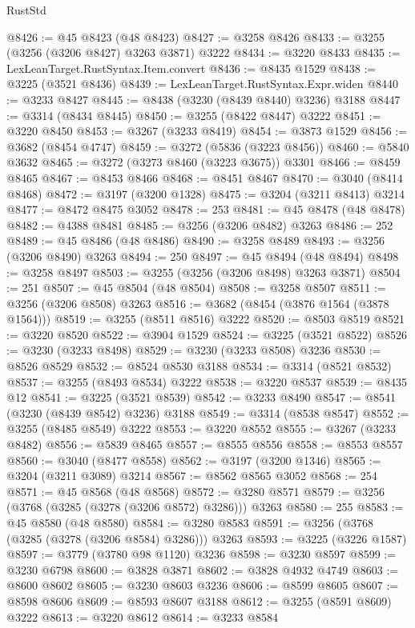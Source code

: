 \begin{lexlean}{RustStd}
\begin{coremodule}
@8426 := @45 @8423 (@48 @8423)
@8427 := @3258 @8426
@8433 := @3255 (@3256 (@3206 @8427) @3263 @3871) @3222
@8434 := @3220 @8433
@8435 := LexLeanTarget.RustSyntax.Item.convert
@8436 := @8435 @1529
@8438 := @3225 (@3521 @8436)
@8439 := LexLeanTarget.RustSyntax.Expr.widen
@8440 := @3233 @8427
@8445 := @8438 (@3230 (@8439 @8440) @3236) @3188
@8447 := @3314 (@8434 @8445)
@8450 := @3255 (@8422 @8447) @3222
@8451 := @3220 @8450
@8453 := @3267 (@3233 @8419)
@8454 := @3873 @1529
@8456 := @3682 (@8454 @4747)
@8459 := @3272 (@5836 (@3223 @8456))
@8460 := @5840 @3632
@8465 := @3272 (@3273 @8460 (@3223 @3675)) @3301
@8466 := @8459 @8465
@8467 := @8453 @8466
@8468 := @8451 @8467
@8470 := @3040 (@8414 @8468)
@8472 := @3197 (@3200 @1328)
@8475 := @3204 (@3211 @8413) @3214
@8477 := @8472 @8475 @3052
@8478 := 253
@8481 := @45 @8478 (@48 @8478)
@8482 := @4388 @8481
@8485 := @3256 (@3206 @8482) @3263
@8486 := 252
@8489 := @45 @8486 (@48 @8486)
@8490 := @3258 @8489
@8493 := @3256 (@3206 @8490) @3263
@8494 := 250
@8497 := @45 @8494 (@48 @8494)
@8498 := @3258 @8497
@8503 := @3255 (@3256 (@3206 @8498) @3263 @3871)
@8504 := 251
@8507 := @45 @8504 (@48 @8504)
@8508 := @3258 @8507
@8511 := @3256 (@3206 @8508) @3263
@8516 := @3682 (@8454 (@3876 @1564 (@3878 @1564)))
@8519 := @3255 (@8511 @8516) @3222
@8520 := @8503 @8519
@8521 := @3220 @8520
@8522 := @3904 @1529
@8524 := @3225 (@3521 @8522)
@8526 := @3230 (@3233 @8498)
@8529 := @3230 (@3233 @8508) @3236
@8530 := @8526 @8529
@8532 := @8524 @8530 @3188
@8534 := @3314 (@8521 @8532)
@8537 := @3255 (@8493 @8534) @3222
@8538 := @3220 @8537
@8539 := @8435 @12
@8541 := @3225 (@3521 @8539)
@8542 := @3233 @8490
@8547 := @8541 (@3230 (@8439 @8542) @3236) @3188
@8549 := @3314 (@8538 @8547)
@8552 := @3255 (@8485 @8549) @3222
@8553 := @3220 @8552
@8555 := @3267 (@3233 @8482)
@8556 := @5839 @8465
@8557 := @8555 @8556
@8558 := @8553 @8557
@8560 := @3040 (@8477 @8558)
@8562 := @3197 (@3200 @1346)
@8565 := @3204 (@3211 @3089) @3214
@8567 := @8562 @8565 @3052
@8568 := 254
@8571 := @45 @8568 (@48 @8568)
@8572 := @3280 @8571
@8579 := @3256 (@3768 (@3285 (@3278 (@3206 @8572) @3286))) @3263
@8580 := 255
@8583 := @45 @8580 (@48 @8580)
@8584 := @3280 @8583
@8591 := @3256 (@3768 (@3285 (@3278 (@3206 @8584) @3286))) @3263
@8593 := @3225 (@3226 @1587)
@8597 := @3779 (@3780 @98 @1120) @3236
@8598 := @3230 @8597
@8599 := @3230 @6798
@8600 := @3828 @3871
@8602 := @3828 @4932 @4749
@8603 := @8600 @8602
@8605 := @3230 @8603 @3236
@8606 := @8599 @8605
@8607 := @8598 @8606
@8609 := @8593 @8607 @3188
@8612 := @3255 (@8591 @8609) @3222
@8613 := @3220 @8612
@8614 := @3233 @8584

\end{coremodule}
\end{lexlean}
